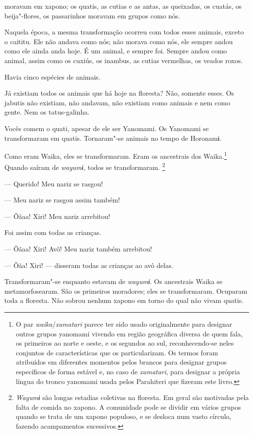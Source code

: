  

 moravam em xapono; os quatis, as cutias e as antas, as
queixadas, os cuatás, os beija"-flores, os passarinhos moravam em grupos
como nós.

Naquela época, a mesma transformação ocorreu com todos esses animais,
exceto o caititu. Ele não andava como nós; não morava como nós, ele
sempre andou como ele ainda anda hoje. É um animal, e sempre foi. Sempre
andou como animal, assim como os cuxiús, os inambus, as cutias
vermelhas, os veados roxos.

Havia cinco espécies de animais. 

Já existiam todos os animais que há hoje na floresta? Não, somente
esses. Os jabutis não existiam, não andavam, não existiam como animais e
nem como gente. Nem os tatus-galinha. 

Vocês comem o quati, apesar de ele ser Yanomami. Os Yanomami se
transformaram em quatis. Tornaram"-se animais no tempo de Horonamɨ. 

Como eram Waika, eles se transformaram. Eram os ancestrais dos Waika.\footnote{O par \emph{waika}/\emph{xamatari} parece ter sido usado originalmente para designar outros grupos yanomami vivendo em região geográfica diversa de quem fala, os primeiros ao norte e oeste, e os segundos ao sul, reconhecendo-se neles conjuntos de características que os particularizam. Os termos foram atribuídos em diferentes momentos pelos brancos para designar grupos específicos de forma estável e, no caso de \emph{xamatari}, para designar a própria língua do tronco yanomami usada pelos Parahiteri que fizeram este livro.} Quando saíram de \emph{wayumɨ}, todos se transformaram. \footnote{   \emph{Wayumɨ} são longas estadias coletivas na floresta. Em geral são motivadas pela falta de comida no xapono. A comunidade pode se dividir em vários grupos quando se trata de um xapono populoso, e se desloca num vasto círculo, fazendo acampamentos sucessivos.} 

--- Querido! Meu nariz se rasgou! 

--- Meu nariz se rasgou assim também!

--- Õãaa! Xiri! Meu nariz arrebitou! 

Foi assim com todas as crianças. 

--- Õãaa! Xiri! Avô! Meu nariz também arrebitou! 

--- Õãa! Xiri! --- disseram todas as crianças ao avô delas. 

Transformaram"-se enquanto estavam de \emph{wayumɨ}. Os ancestrais Waika
se metamorfosearam. São os primeiros moradores; eles se transformaram.
Ocuparam toda a floresta. Não sobrou nenhum xapono em torno do qual não
vivam quatis. 


